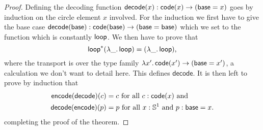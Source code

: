 \begin{proof}
Defining the decoding function 
$\mathsf{decode}(x) : \mathsf{code}(x) \to (\mathsf{base} = x)$
goes by induction on the circle element
$x$ involved.
For the induction we first have to give the base case
$\mathsf{decode}(\mathsf{base}) : \mathsf{code}(\mathsf{base}) \to (\mathsf{base} = \mathsf{base})$ which we set to the function which is
constantly $\mathsf{loop}$.
We then have to prove that
\begin{equation*}
\mathsf{loop}^*(\lambda \_.\, \mathsf{loop}) = (\lambda\_.\, \mathsf{loop}) \text{,}
\end{equation*}
where the transport is over the type family $\lambda x'.\, \mathsf{code}(x') \to (\mathsf{base} = x')$,
a calculation we don't want to detail here. This defines $\mathsf{decode}$.
It is then left to prove by induction that
\begin{align*}
\mathsf{encode}(\mathsf{decode})(c) &= c \text{ for all $c : \mathsf{code}(x)$ and} \\
\mathsf{decode}(\mathsf{encode})(p) &= p \text{ for all $x : \mathbb{S}^1$ and $p : \mathsf{base} = x$.}
\end{align*}
completing the proof of the theorem.
\end{proof}

